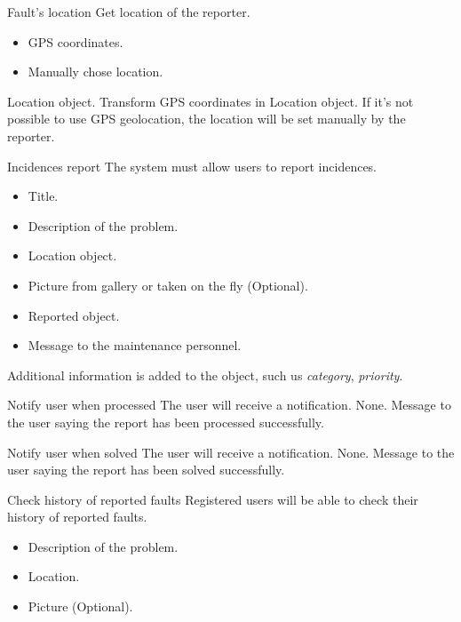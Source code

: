 
\begin{requirement}{Fault's location}
\reqdesc Get location of the reporter.
\reqin
\begin{itemize}
\item GPS coordinates.
\item Manually chose location.
\end{itemize}
\reqout Location object.
\reqsteps Transform GPS coordinates in Location object. If it's not possible to use GPS geolocation, the location will be set manually by the reporter.
\end{requirement}

\begin{requirement}{Incidences report}
\reqdesc The system must allow users to report incidences.
\reqin
\begin{itemize}
	\item Title.
	\item Description of the problem.
	\item Location object.
	\item Picture from gallery or taken on the fly (Optional).
\end{itemize}
\reqout

\begin{itemize}
	\item Reported object.
	\item Message to the maintenance personnel.
\end{itemize}
\reqsteps Additional information is added to the object, such us \textit{category}, \textit{priority}.
\end{requirement}

\begin{requirement}{Notify user when processed}
\reqdesc The user will receive a notification.
\reqin None.
\reqout Message to the user saying the report has been processed successfully.
\end{requirement}

\begin{requirement}{Notify user when solved}
\reqdesc The user will receive a notification.
\reqin None.
\reqout Message to the user saying the report has been solved successfully.
\end{requirement}

\begin{requirement}{Check history of reported faults}
\reqdesc Registered users will be able to check their history of reported faults.
\reqin
\begin{itemize}
	\item Description of the problem.
	\item Location.
	\item Picture (Optional).
\end{itemize}
\reqout
\reqsteps
\end{requirement}
